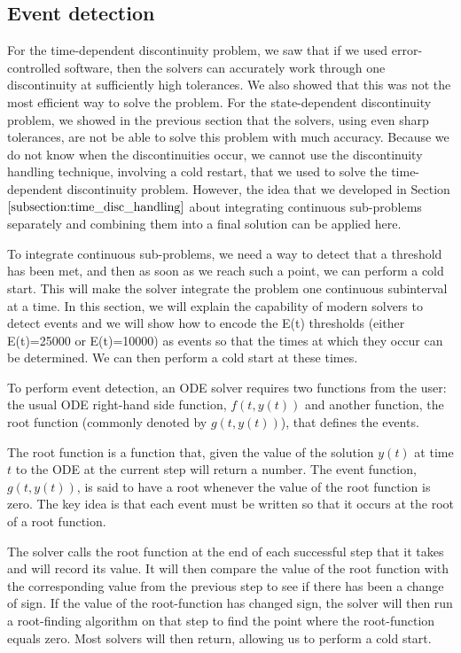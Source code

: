 \subsection{Event detection}
\label{subsection:intro_event_detection}
For the time-dependent discontinuity problem, we saw that if we used error-controlled software, then the solvers can accurately work through one discontinuity at sufficiently high tolerances. We also showed that this was not the most efficient way to solve the problem. For the state-dependent discontinuity problem, we showed in the previous section that the solvers, using even sharp tolerances, are not be able to solve this problem with much accuracy. Because we do not know when the discontinuities occur, we cannot use the discontinuity handling technique, involving a cold restart, that we used to solve the time-dependent discontinuity problem. However, the idea that we developed in Section $\ref{subsection:time_disc_handling}$ about integrating continuous sub-problems separately and combining them into a final solution can be applied here. 

To integrate continuous sub-problems, we need a way to detect that a threshold has been met, and then as soon as we reach such a point, we can perform a cold start. This will make the solver integrate the problem one continuous subinterval at a time. In this section, we will explain the capability of modern solvers to detect events and we will show how to encode the E(t) thresholds (either E(t)=25000 or E(t)=10000) as events so that the times at which they occur can be determined. We can then perform a cold start at these times.

To perform event detection, an ODE solver requires two functions from the user: the usual ODE right-hand side function, $f(t, y(t))$ and another function, the root function (commonly denoted by $g(t, y(t))$), that defines the events.

The root function is a function that, given the value of the solution $y(t)$ at time $t$ to the ODE at the current step will return a number. The event function, $g(t, y(t))$, is said to have a root whenever the value of the root function is zero. The key idea is that each event must be written so that it occurs at the root of a root function.

The solver calls the root function at the end of each successful step that it takes and will record its value. It will then compare the value of the root function with the corresponding value from the previous step to see if there has been a change of sign. If the value of the root-function has changed sign, the solver will then run a root-finding algorithm on that step to find the point where the root-function equals zero. Most solvers will then return, allowing us to perform a cold start.


